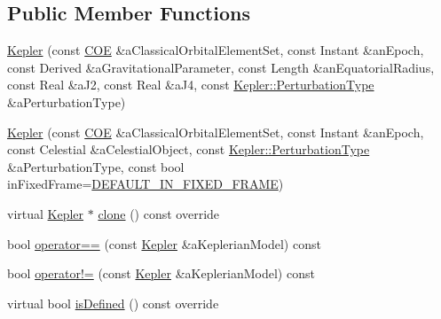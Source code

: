 \subsection*{Public Member Functions}
\begin{DoxyCompactItemize}
\item 
\hyperlink{classostk_1_1astro_1_1trajectory_1_1orbit_1_1models_1_1_kepler_aebd9792c0965b4539a553afad07aff7a}{Kepler} (const \hyperlink{classostk_1_1astro_1_1trajectory_1_1orbit_1_1models_1_1kepler_1_1_c_o_e}{C\+OE} \&a\+Classical\+Orbital\+Element\+Set, const Instant \&an\+Epoch, const Derived \&a\+Gravitational\+Parameter, const Length \&an\+Equatorial\+Radius, const Real \&a\+J2, const Real \&a\+J4, const \hyperlink{classostk_1_1astro_1_1trajectory_1_1orbit_1_1models_1_1_kepler_a3750f9177ff06a1938826e2c2881d5a9}{Kepler\+::\+Perturbation\+Type} \&a\+Perturbation\+Type)
\item 
\hyperlink{classostk_1_1astro_1_1trajectory_1_1orbit_1_1models_1_1_kepler_af91d91131679176d920c658facaab07c}{Kepler} (const \hyperlink{classostk_1_1astro_1_1trajectory_1_1orbit_1_1models_1_1kepler_1_1_c_o_e}{C\+OE} \&a\+Classical\+Orbital\+Element\+Set, const Instant \&an\+Epoch, const Celestial \&a\+Celestial\+Object, const \hyperlink{classostk_1_1astro_1_1trajectory_1_1orbit_1_1models_1_1_kepler_a3750f9177ff06a1938826e2c2881d5a9}{Kepler\+::\+Perturbation\+Type} \&a\+Perturbation\+Type, const bool in\+Fixed\+Frame=\hyperlink{_kepler_8hpp_a42fbab7c9532a311984a768a10f815aa}{D\+E\+F\+A\+U\+L\+T\+\_\+\+I\+N\+\_\+\+F\+I\+X\+E\+D\+\_\+\+F\+R\+A\+ME})
\item 
virtual \hyperlink{classostk_1_1astro_1_1trajectory_1_1orbit_1_1models_1_1_kepler}{Kepler} $\ast$ \hyperlink{classostk_1_1astro_1_1trajectory_1_1orbit_1_1models_1_1_kepler_afb76b3571c73fb5c87129033f7d66520}{clone} () const override
\item 
bool \hyperlink{classostk_1_1astro_1_1trajectory_1_1orbit_1_1models_1_1_kepler_a0fa60d97287b75564e1e5a2390f137f4}{operator==} (const \hyperlink{classostk_1_1astro_1_1trajectory_1_1orbit_1_1models_1_1_kepler}{Kepler} \&a\+Keplerian\+Model) const
\item 
bool \hyperlink{classostk_1_1astro_1_1trajectory_1_1orbit_1_1models_1_1_kepler_aac43844f43000a181bf504529763bc82}{operator!=} (const \hyperlink{classostk_1_1astro_1_1trajectory_1_1orbit_1_1models_1_1_kepler}{Kepler} \&a\+Keplerian\+Model) const
\item 
virtual bool \hyperlink{classostk_1_1astro_1_1trajectory_1_1orbit_1_1models_1_1_kepler_a4c74402d5483a51e5e0fe1920cd52ec4}{is\+Defined} () const override

\end{DoxyCompactItemize}
